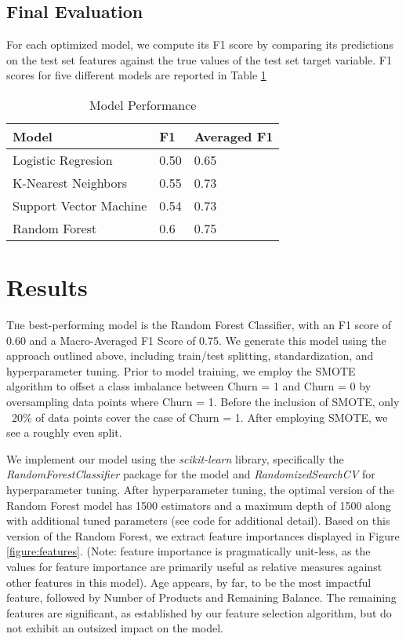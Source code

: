 \documentclass[twoside,twocolumn]{article}
\begin{document}
\noindent \subsection{Final Evaluation} For each optimized model, we compute its F1 score by comparing its predictions on the test set features against the true values of the test set target variable. F1 scores for five different models are reported in Table \ref{table:modelperf}
\begin{table}
  \centering
  \caption{Model Performance}
  \begin{tabular}{lll}
  \toprule
                   Model &    F1 & Averaged F1 \\
  \midrule
      Logistic Regresion &   0.50 &               0.65 \\
     K-Nearest Neighbors &  0.55 &              0.73 \\
  Support Vector Machine &  0.54 &              0.73 \\
           Random Forest &   0.6 &              0.75 \\
  \bottomrule
  \end{tabular}
  \label{table:modelperf}
  \end{table}

\section{Results}
\lettrine[nindent=0em,lines=2]{T}he best-performing model is the Random Forest Classifier, with an F1 score of 0.60 and a Macro-Averaged F1 Score of 0.75. 
We generate this model using the approach outlined above, including train/test splitting, standardization, and hyperparameter tuning. 
Prior to model training, we employ the SMOTE algorithm to offset a class imbalance between Churn = 1 and Churn = 0 by oversampling data points where Churn = 1. Before the inclusion of SMOTE, only ~20\% of data points cover the case of Churn = 1. After employing SMOTE, we see a roughly even split. 



We implement our model using the \textit{scikit-learn} library, specifically the \textit{RandomForestClassifier} package for the model and \textit{RandomizedSearchCV} for hyperparameter tuning. After hyperparameter tuning, the optimal version of the Random Forest model has 1500 estimators and a maximum depth of 1500 along with additional tuned parameters (see code for additional detail). Based on this version of the Random Forest, we extract feature importances displayed in Figure \ref{figure:features}. (Note: feature importance is pragmatically unit-less, as the values for feature importance are primarily useful as relative measures against other features in this model). 
Age appears, by far, to be the most impactful feature, followed by Number of Products and Remaining Balance. The remaining features are significant, as established by our feature selection algorithm, but do not exhibit an outsized impact on the model. 
\end{document}
